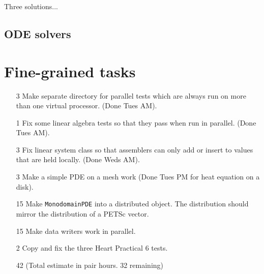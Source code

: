 \documentclass{article}
\begin{document}
Three solutions...

\subsection{ODE solvers}

\section{Fine-grained tasks}

\begin{itemize}
\item[3]
Make separate directory for parallel tests which are always run on
more than one virtual processor.  (Done Tues AM).
\item[1]
Fix some linear algebra tests so that they pass when run in
parallel. (Done Tues AM). 
\item[3] 
Fix linear system class so that assemblers can only add or insert to
values that are held locally. (Done Weds AM).
\item[3]
Make a simple PDE on a mesh work (Done Tues PM for heat equation on a disk).
\item[15]
Make {\tt MonodomainPDE} into a distributed object. The distribution
should mirror the distribution of a PETSc vector.
\item[15]
Make data writers work in parallel.
\item[2] 
Copy and fix the three Heart Practical 6 tests.
\item[42] (Total estimate in pair hours.  32 remaining)
\end{itemize}
\end{document}
